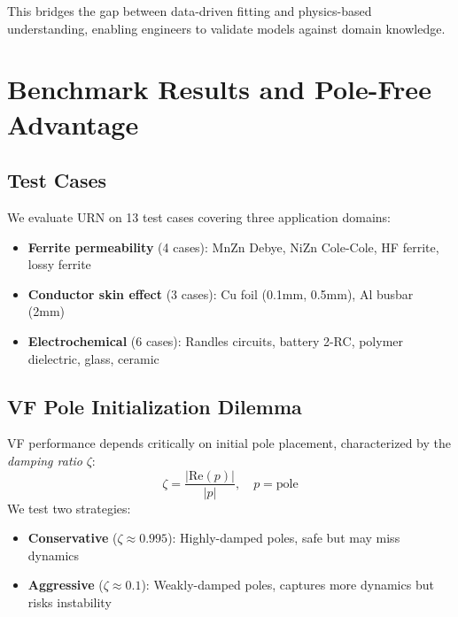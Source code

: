 \documentclass{ieeeaccess}
\begin{document}
This bridges the gap between data-driven fitting and physics-based understanding, enabling engineers to validate models against domain knowledge.

\section{Benchmark Results and Pole-Free Advantage}
\label{sec:results}

\subsection{Test Cases}

We evaluate URN on 13 test cases covering three application domains:
\begin{itemize}
\item \textbf{Ferrite permeability} (4 cases): MnZn Debye, NiZn Cole-Cole, HF ferrite, lossy ferrite
\item \textbf{Conductor skin effect} (3 cases): Cu foil (0.1mm, 0.5mm), Al busbar (2mm)
\item \textbf{Electrochemical} (6 cases): Randles circuits, battery 2-RC, polymer dielectric, glass, ceramic
\end{itemize}


\subsection{VF Pole Initialization Dilemma}

VF performance depends critically on initial pole placement, characterized by the \textit{damping ratio} $\zeta$:
\begin{equation}
\zeta = \frac{|\text{Re}(p)|}{|p|}, \quad p = \text{pole}
\end{equation}
We test two strategies:
\begin{itemize}
\item \textbf{Conservative} ($\zeta \approx 0.995$): Highly-damped poles, safe but may miss dynamics
\item \textbf{Aggressive} ($\zeta \approx 0.1$): Weakly-damped poles, captures more dynamics but risks instability
\end{itemize}
\end{document}
